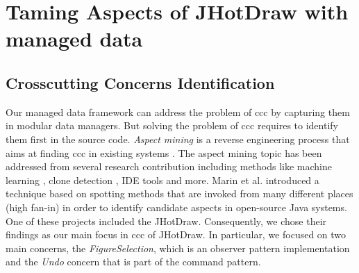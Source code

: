 
\chapter{Taming Aspects of JHotDraw \newline with managed data}\label{AspectRefactoring}

\section{Crosscutting Concerns Identification}
Our managed data framework can address the problem of \ac{ccc} by capturing them in modular data managers.
But solving the problem of \ac{ccc} requires to identify them first in the source code.
\textit{Aspect mining} is a reverse engineering process that aims at finding \ac{ccc} in existing systems \cite{marin2004identifying}.
The aspect mining topic has been addressed from several research contribution including methods like machine learning \cite{shepherd2004design}, clone detection \cite{bruntink2005use}, IDE tools \cite{robillard2002concern} and more. 
Marin et al. \cite{marin2004identifying} introduced a technique based on spotting methods that are invoked from many different places (high fan-in) in order to identify candidate aspects in open-source Java systems.
One of these projects included the JHotDraw.
Consequently, we chose their findings as our main focus in \ac{ccc} of JHotDraw.
In particular, we focused on two main concerns, the \textit{FigureSelection}, which is an observer pattern implementation and the \textit{Undo} concern that is part of the command pattern.

